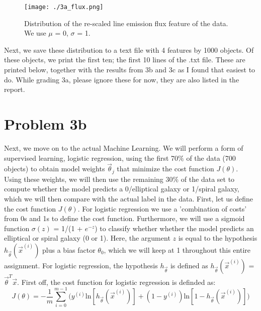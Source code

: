 \begin{figure}[h!]
  \centering
  \texttt{[image: ./3a\_flux.png]}
  \caption{Distribution of the re-scaled line emission flux feature of the data. We use $\mu$ = 0, $\sigma$ = 1.}
\end{figure}

\clearpage

Next, we save these distribution to a text file with 4 features by 1000 objects. Of these objects, we print the first ten; the first 10 lines of the .txt file. These are printed below, together with the results from 3b and 3c as I found that easiest to do. While grading 3a, please ignore these for now, they are also listed in the report. 



\newpage

\section*{Problem 3b}

Next, we move on to the actual Machine Learning. We will perform a form of supervised learning, logistic regression, using the first 70$\%$ of the data (700 objects) to obtain model weights $\vec{\theta}_j$ that minimize the cost function $J(\theta)$. Using these weights, we will then use the remaining 30$\%$ of the data set to compute whether the model predicts a 0/elliptical galaxy or 1/spiral galaxy, which we will then compare with the actual label in the data. First, let us define the cost function $J(\theta)$. For logistic regression we use a 'combination of costs' from 0s and 1s to define the cost function. Furthermore, we will use a sigmoid function $\sigma(z)$ = 1/(1 + $e^{-z}$) to classify whether whether the model predicts an elliptical or spiral galaxy (0 or 1). Here, the argument $z$ is equal to the hypothesis $h_{\vec{\theta}}(\vec{x}^{(i)})$ plus a bias factor $\theta_0$, which we will keep at 1 throughout this entire assignment. For logistic regression, the hypothesis $h_{\vec{\theta}}$ is defined as $h_{\vec{\theta}}(\vec{x}^{(i)})$ = $\vec{\theta}^T \vec{x}$. First off, the cost function for logistic regression is definded as:\\

\begin{equation}
J(\theta) = -\frac{1}{m} \sum_{i=0}^{m-1} \Big( y^{(i)} \text{ln}[h_{\vec{\theta}}(\vec{x}^{(i)})] + (1 - y^{(i)}) \text{ln} [1 - h_{\vec{\theta}}(\vec{x}^{(i)})]\Big)
\end{equation}

